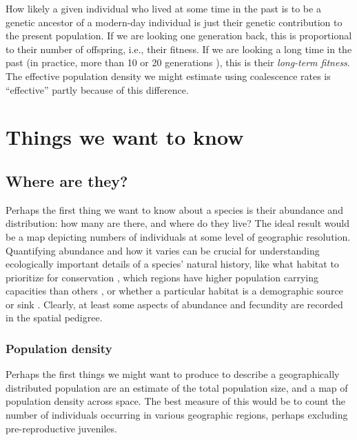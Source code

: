 \documentclass{ar-1col}
\newcommand{\plr}[1]{{\color{green}{#1}}}
\newcommand{\todo}[1]{{\textbf{\color{red}{#1}}}}
\begin{document}
\plr{moved from below}
How likely a given individual who lived at some time in the past
is to be a genetic ancestor of a modern-day individual
is just their genetic contribution to the present population.
If we are looking one generation back, 
this is proportional to their number of offspring, i.e., their fitness.
If we are looking a long time in the past
(in practice, more than 10 or 20 generations \citep{bartonfitness}),
this is their \textit{long-term fitness}.
The effective population density we might estimate using coalescence rates
is ``effective'' partly because of this difference.

\plr{note on differences between genetic and genealogical ancestry?}

\plr{tie up}

\section{Things we want to know}

\subsection{Where are they?}

Perhaps the first thing we want to know about a species
is their abundance and distribution:
how many are there, and where do they live?
The ideal result would be a map depicting numbers of individuals
at some level of geographic resolution.
Quantifying abundance and how it varies
can be crucial for understanding
ecologically important details of a species' natural history,
like what habitat to prioritize for conservation \citep{zipkin2018synthesizing}, 
which regions have higher population carrying capacities than others \citep{roughgarden1974}, 
or whether a particular habitat is a demographic source or sink 
\citep{pulliam1988sources}.
Clearly, at least some aspects of abundance and fecundity are recorded in the spatial pedigree.

\subsubsection{Population density}

\todo{tidy up and tie together}

Perhaps the first things we might want to produce
to describe a geographically distributed population
are an estimate of the total population size,
and a map of population density across space.
The best measure of this
would be to count the number of individuals occurring in various geographic regions,
perhaps excluding pre-reproductive juveniles.
\end{document}
